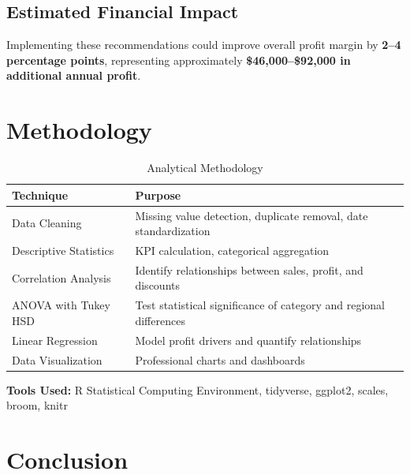 \documentclass[11pt,a4paper]{article}
\begin{document}
\subsection{Estimated Financial Impact}

\begin{tcolorbox}[
    colback=profitgreen!5,
    colframe=profitgreen!50,
    arc=8pt,
    left=15pt,
    right=15pt
]
Implementing these recommendations could improve overall profit margin by \textbf{2--4 percentage points}, representing approximately \textbf{\$46,000--\$92,000 in additional annual profit}.
\end{tcolorbox}

\section{Methodology}

\begin{table}[H]
\centering
\begin{tabular}{@{}p{4cm} p{7cm}@{}}
\toprule
\rowcolor{primary!10}
\textbf{Technique} & \textbf{Purpose} \\
\midrule
Data Cleaning & Missing value detection, duplicate removal, date standardization \\
Descriptive Statistics & KPI calculation, categorical aggregation \\
Correlation Analysis & Identify relationships between sales, profit, and discounts \\
ANOVA with Tukey HSD & Test statistical significance of category and regional differences \\
Linear Regression & Model profit drivers and quantify relationships \\
Data Visualization & Professional charts and dashboards \\
\bottomrule
\end{tabular}
\caption{Analytical Methodology}
\end{table}

\textbf{Tools Used:} R Statistical Computing Environment, tidyverse, ggplot2, scales, broom, knitr

\section{Conclusion}
\end{document}
